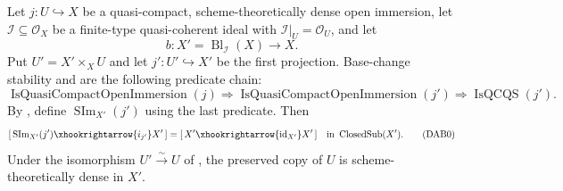 \begin{lemma}
  \label{lemma:nagata-dense-admissible-blowup}

  Let $j\colon U\hookrightarrow X$ be a quasi-compact,
  scheme-theoretically dense open immersion, let
  $\mathcal I\subseteq\mathcal O_X$ be a finite-type quasi-coherent ideal
  with $\mathcal I|_U=\mathcal O_U$, and let
  \[
    b\colon X'=\operatorname{Bl}_{\mathcal I}(X)\longrightarrow X.
  \]
  Put $U'=X'\times_XU$ and let $j'\colon U'\hookrightarrow X'$ be the first
  projection.  Base-change stability and
   are the following predicate
  chain:
  \[
    \operatorname{IsQuasiCompactOpenImmersion}(j)
      \Longrightarrow
        \operatorname{IsQuasiCompactOpenImmersion}(j')
      \Longrightarrow
        \operatorname{IsQCQS}(j').
  \]
  By , define
  $\operatorname{SIm}_{X'}(j')$ using the last predicate.  Then
  \[
    [\,\operatorname{SIm}_{X'}(j')\xhookrightarrow{i_{j'}}X'\,]
      =[\,X'\xhookrightarrow{\operatorname{id}_{X'}}X'\,]
      \quad\text{in }\operatorname{ClosedSub}(X').              \tag{DAB0}
  \]
  Under the isomorphism
  $U'\xrightarrow{\sim}U$ of
  , the preserved copy of $U$ is
  scheme-theoretically dense in $X'$.
\end{lemma}

